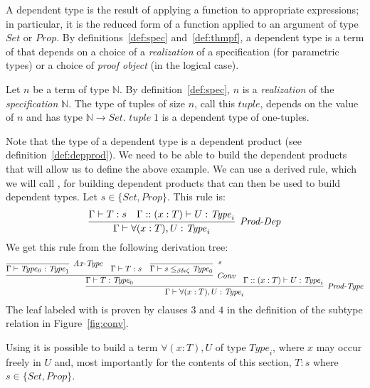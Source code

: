 
A dependent type is the result of applying a function to appropriate expressions; in particular, it is the reduced form of a function applied to an argument of type $\mathit{Set}$ or $\mathit{Prop}$. By definitions~\ref{def:spec} and~\ref{def:thmpf}, a dependent type is a term of \coc{} that depends on a choice of a \emph{realization} of a specification (for parametric types) or a choice of \emph{proof object} (in the logical case).

\begin{expl}
Let $n$ be a term of type $\mathbb{N}$. By definition~\ref{def:spec}, $n$ is a \emph{realization} of the \emph{specification} $\mathbb{N}$. The type of tuples of size $n$, call this $\mathit{tuple}$, depends on the value of $n$ and has type $\mathbb{N} \rightarrow \mathit{Set}$. $\mathit{tuple} \; 1$ is a dependent type of one-tuples. 
\end{expl}


Note that the type of a dependent type is a dependent product (see definition~\ref{def:depprod}). We need to be able to build the dependent products that will allow us to define the above example. We can use a derived rule, which we will call , for building dependent products that can then be used to build dependent types. Let $s \in \{ \mathit{Set} , \mathit{Prop} \}$. This rule is:
$$
\infer[\rl{Prod-Dep}]{\seq{\forall (x : T), U : \mathit{Type}_i}}{\seq{T : s} & \seq[\dyncon{} :: (x : T)]{U : \mathit{Type}_i}}
$$
We get this rule from the following derivation tree:
{\scriptsize
$$
\infer[\rl{Prod-Type}]{\seq{\forall (x : T), U : \mathit{Type}_i}}{
  \infer[\rl{Conv}]{\seq{T : \mathit{Type}_0}}{\infer[\rl{Ax-Type}]{\seq{\mathit{Type_0} : \mathit{Type}_1}}{} & \seq{T : s} & \infer[\rl{*}]{\seq{s \subtype{} \mathit{Type}_0}}{}}
  &
  \seq[\dyncon{} :: (x : T)]{U : \mathit{Type}_i}}
$$
}
The leaf labeled with \rl{*} is proven by clauses $3$ and $4$ in the definition of the subtype relation in Figure~\ref{fig:conv}.

Using  it is possible to build a term $\forall (x : T), U$ of type $\mathit{Type}_i$, where $x$ may occur freely in $U$ and, most importantly for the contents of this section, $T : s$ where $s \in \{ \mathit{Set}, \mathit{Prop} \}$.%

